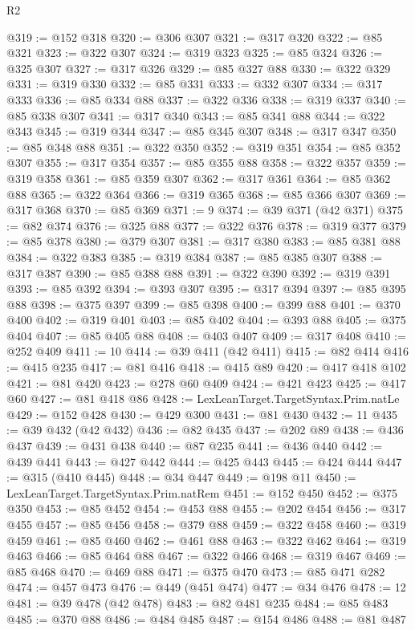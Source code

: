 \begin{lexlean}{R2}
\begin{coremodule}
@319 := @152 @318
@320 := @306 @307
@321 := @317 @320
@322 := @85 @321
@323 := @322 @307
@324 := @319 @323
@325 := @85 @324
@326 := @325 @307
@327 := @317 @326
@329 := @85 @327 @88
@330 := @322 @329
@331 := @319 @330
@332 := @85 @331
@333 := @332 @307
@334 := @317 @333
@336 := @85 @334 @88
@337 := @322 @336
@338 := @319 @337
@340 := @85 @338 @307
@341 := @317 @340
@343 := @85 @341 @88
@344 := @322 @343
@345 := @319 @344
@347 := @85 @345 @307
@348 := @317 @347
@350 := @85 @348 @88
@351 := @322 @350
@352 := @319 @351
@354 := @85 @352 @307
@355 := @317 @354
@357 := @85 @355 @88
@358 := @322 @357
@359 := @319 @358
@361 := @85 @359 @307
@362 := @317 @361
@364 := @85 @362 @88
@365 := @322 @364
@366 := @319 @365
@368 := @85 @366 @307
@369 := @317 @368
@370 := @85 @369
@371 := 9
@374 := @39 @371 (@42 @371)
@375 := @82 @374
@376 := @325 @88
@377 := @322 @376
@378 := @319 @377
@379 := @85 @378
@380 := @379 @307
@381 := @317 @380
@383 := @85 @381 @88
@384 := @322 @383
@385 := @319 @384
@387 := @85 @385 @307
@388 := @317 @387
@390 := @85 @388 @88
@391 := @322 @390
@392 := @319 @391
@393 := @85 @392
@394 := @393 @307
@395 := @317 @394
@397 := @85 @395 @88
@398 := @375 @397
@399 := @85 @398
@400 := @399 @88
@401 := @370 @400
@402 := @319 @401
@403 := @85 @402
@404 := @393 @88
@405 := @375 @404
@407 := @85 @405 @88
@408 := @403 @407
@409 := @317 @408
@410 := @252 @409
@411 := 10
@414 := @39 @411 (@42 @411)
@415 := @82 @414
@416 := @415 @235
@417 := @81 @416
@418 := @415 @89
@420 := @417 @418 @102
@421 := @81 @420
@423 := @278 @60 @409
@424 := @421 @423
@425 := @417 @60
@427 := @81 @418 @86
@428 := LexLeanTarget.TargetSyntax.Prim.natLe
@429 := @152 @428
@430 := @429 @300
@431 := @81 @430
@432 := 11
@435 := @39 @432 (@42 @432)
@436 := @82 @435
@437 := @202 @89
@438 := @436 @437
@439 := @431 @438
@440 := @87 @235
@441 := @436 @440
@442 := @439 @441
@443 := @427 @442
@444 := @425 @443
@445 := @424 @444
@447 := @315 (@410 @445)
@448 := @34 @447
@449 := @198 @11
@450 := LexLeanTarget.TargetSyntax.Prim.natRem
@451 := @152 @450
@452 := @375 @350
@453 := @85 @452
@454 := @453 @88
@455 := @202 @454
@456 := @317 @455
@457 := @85 @456
@458 := @379 @88
@459 := @322 @458
@460 := @319 @459
@461 := @85 @460
@462 := @461 @88
@463 := @322 @462
@464 := @319 @463
@466 := @85 @464 @88
@467 := @322 @466
@468 := @319 @467
@469 := @85 @468
@470 := @469 @88
@471 := @375 @470
@473 := @85 @471 @282
@474 := @457 @473
@476 := @449 (@451 @474)
@477 := @34 @476
@478 := 12
@481 := @39 @478 (@42 @478)
@483 := @82 @481 @235
@484 := @85 @483
@485 := @370 @88
@486 := @484 @485
@487 := @154 @486
@488 := @81 @487

\end{coremodule}
\end{lexlean}
